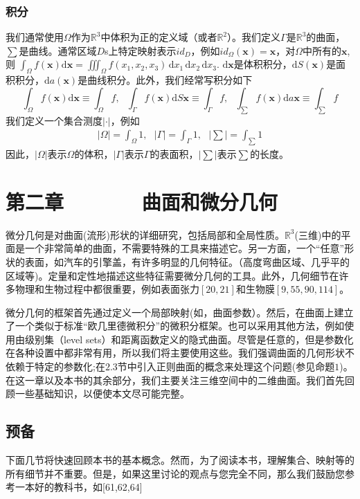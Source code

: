 \documentclass[12pt,a4paper]{article}
\numberwithin{equation}{section}
\begin{document}
\subsubsection{积分}
我们通常使用$\Omega$作为$\mathbb{R}^3$中体积为正的定义域（或者$\mathbb{R}^2$）。我们定义$\Gamma$是$\mathbb{R}^3$的曲面，$\sum$是曲线。通常区域$D$s上特定映射表示$id_D$，例如$id_{\Omega}(\mathbf{x})=\mathbf{x}$，对$\Omega$中所有的$\mathbf{x}$,则
$\int _{\Omega} f(\mathbf{x})\mathrm{d}\mathbf{x}=\iiint_{\Omega} f(x_1,x_2,x_3)\,
\mathrm{d}x_1\,\mathrm{d}x_2\,\mathrm{d}x_3.$
$\mathrm{d}\mathbf{x}$是体积积分，$\mathrm{d}S(\mathbf{x})$是面积积分，$\mathrm{d}a(\mathbf{x})$是曲线积分。此外，我们经常写积分如下
$$
\int _{\Omega} f(\mathbf{x})\mathrm{d}\mathbf{x} \equiv \int _{\Omega} f,~~~\int _{\Gamma} f(\mathbf{x})\mathrm{d}S\mathbf{x} \equiv \int _{\Gamma} f,~~~\int _{\sum} f(\mathbf{x})\mathrm{d}a\mathbf{x} \equiv \int _{\sum} f
$$
我们定义一个集合测度$|\cdot|$，例如
\begin{gather}
|\Omega|=\int _{\Omega}1,~~~|\Gamma|=\int _{\Gamma}1,~~~|\sum|=\int _{\sum}1
\end{gather}
因此，$|\Omega|$表示$\Omega$的体积，$|\Gamma|$表示$\Gamma$的表面积，$|\sum|$表示$\sum$的长度。

\section{第二章~~~~~~~曲面和微分几何}

微分几何是对曲面(流形)形状的详细研究，包括局部和全局性质。$\mathbb{R}^3$(三维)中的平面是一个非常简单的曲面，不需要特殊的工具来描述它。另一方面，一个“任意”形状的表面，如汽车的引擎盖，有许多明显的几何特征。（高度弯曲区域、几乎平的区域等)。定量和定性地描述这些特征需要微分几何的工具。此外，几何细节在许多物理和生物过程中都很重要，例如表面张力$[20,21]$和生物膜$[9,55,90,114]$。

微分几何的框架首先通过定义一个局部映射(如，曲面参数）。然后，在曲面上建立了一个类似于标准“欧几里德微积分”的微积分框架。也可以采用其他方法，例如使用由级别集（level sets）和距离函数定义的隐式曲面。尽管是任意的，但是参数化在各种设置中都非常有用，所以我们将主要使用这些。我们强调曲面的几何形状不依赖于特定的参数化;在$2.3$节中引入正则曲面的概念来处理这个问题(参见命题$1$)。
在这一章以及本书的其余部分，我们主要关注三维空间中的二维曲面。我们首先回顾一些基础知识，以便使本文尽可能完整。

\subsection{预备}
下面几节将快速回顾本书的基本概念。然而，为了阅读本书，理解集合、映射等的所有细节并不重要。但是，如果这里讨论的观点与您完全不同，那么我们鼓励您参考一本好的教科书，如[61,62,64]
\end{document}
